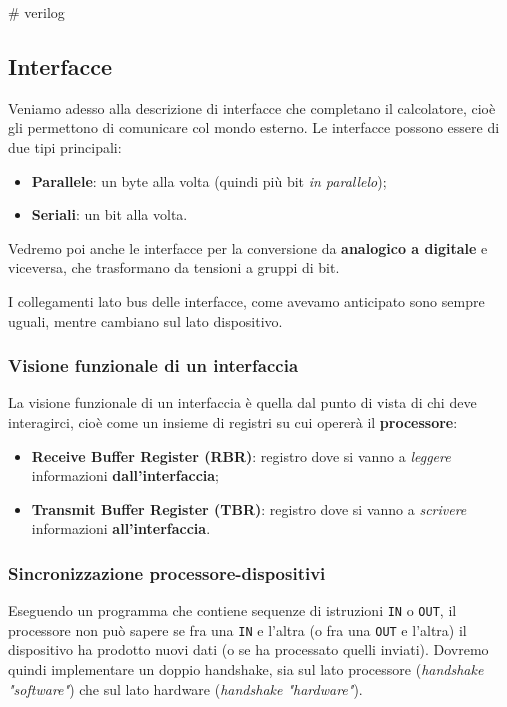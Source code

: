 \documentclass[a4paper,11pt]{article}
\begin{document}
# verilog

\subsection{Interfacce}
Veniamo adesso alla descrizione di interfacce che completano il calcolatore, cioè gli permettono di comunicare col mondo esterno.
Le interfacce possono essere di due tipi principali:
\begin{itemize}
	\item \textbf{Parallele}: un byte alla volta (quindi più bit \textit{in parallelo});
	\item \textbf{Seriali}: un bit alla volta.
\end{itemize}
Vedremo poi anche le interfacce per la conversione da \textbf{analogico a digitale} e viceversa, che trasformano da tensioni a gruppi di bit.

I collegamenti lato bus delle interfacce, come avevamo anticipato sono sempre uguali, mentre cambiano sul lato dispositivo.

\subsubsection{Visione funzionale di un interfaccia}
La visione funzionale di un interfaccia è quella dal punto di vista di chi deve interagirci, cioè come un insieme di registri su cui opererà il \textbf{processore}:
\begin{itemize}
	\item \textbf{Receive Buffer Register (RBR)}: registro dove si vanno a \textit{leggere} informazioni \textbf{dall'interfaccia};
	\item \textbf{Transmit Buffer Register (TBR)}: registro dove si vanno a \textit{scrivere} informazioni \textbf{all'interfaccia}.
\end{itemize}

\subsubsection{Sincronizzazione processore-dispositivi}
Eseguendo un programma che contiene sequenze di istruzioni \lstinline|IN| o \lstinline|OUT|, il processore non può sapere se fra una \lstinline|IN| e l'altra (o fra una \lstinline|OUT| e l'altra) il dispositivo ha prodotto nuovi dati (o se ha processato quelli inviati).
Dovremo quindi implementare un doppio handshake, sia sul lato processore (\textit{handshake "software"}) che sul lato hardware (\textit{handshake "hardware"}).
\end{document}
